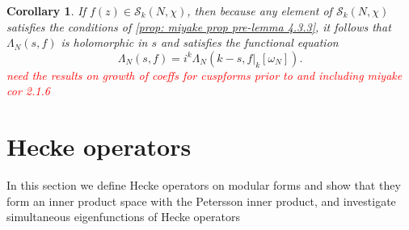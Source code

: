 \documentclass[10pt,leqno,twoside]{article}
\theoremstyle{plain}
\newtheorem{corollary}[lem]{Corollary}
\theoremstyle{definition}
\numberwithin{equation}{section}
\numberwithin{lem}{section}
\newcommand{\textib}[1]{\textbf{\textit{#1\index{#1}}}} %
\newcommand{\tbd}{{\Huge\color{red}{\textib{TBD}}}}
\newcommand{\sai}[1]{\textcolor{red}{#1}}
\begin{document}
\begin{corollary}\label{cor: miyake cor 4.3.7}
    If $f(z)\in \mathcal S_k(N,\chi)$, then because any element of $\mathcal S_k(N,\chi)$ satisfies the conditions of \cref{prop: miyake prop pre-lemma 4.3.3}, it follows that $\varLambda_N(s,f)$ is holomorphic in $s$ and satisfies the functional equation
    \[\varLambda_N(s,f) = i^k\varLambda_N(k-s,f|_k[\omega_N]).\]\sai{need the results on growth of coeffs for cuspforms prior to and including miyake cor 2.1.6}
\end{corollary}

\newpage\section{Hecke operators}
In this section we define Hecke operators on modular forms and show that they form an inner product space with the Petersson inner product, and investigate simultaneous eigenfunctions of Hecke operators \tbd
\end{document}
